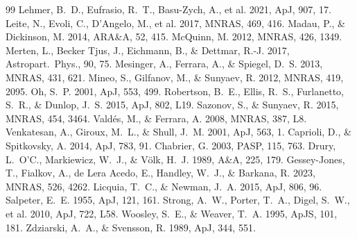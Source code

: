\documentclass[11pt,a4paper]{article}
\begin{document}
\begin{thebibliography}{99}
  Lehmer, B.~D., Eufrasio, R.~T., Basu-Zych, A., et al. 2021, ApJ, 907, 17.
  Leite, N., Evoli, C., D'Angelo, M., et al. 2017, MNRAS, 469, 416.
  Madau, P., \& Dickinson, M. 2014, ARA\&A, 52, 415.
  McQuinn, M. 2012, MNRAS, 426, 1349.
  Merten, L., Becker Tjus, J., Eichmann, B., \& Dettmar, R.-J. 2017,
  Astropart.\ Phys., 90, 75.
  Mesinger, A., Ferrara, A., \& Spiegel, D.~S. 2013, MNRAS, 431, 621.
  Mineo, S., Gilfanov, M., \& Sunyaev, R. 2012, MNRAS, 419, 2095.
  Oh, S.~P. 2001, ApJ, 553, 499.
  Robertson, B.~E., Ellis, R.~S., Furlanetto, S.~R., \& Dunlop, J.~S. 2015,
  ApJ, 802, L19.
  Sazonov, S., \& Sunyaev, R. 2015, MNRAS, 454, 3464.
  Vald\'es, M., \& Ferrara, A. 2008, MNRAS, 387, L8.
  Venkatesan, A., Giroux, M.~L., \& Shull, J.~M. 2001, ApJ, 563, 1.
  Caprioli, D., \& Spitkovsky, A. 2014, ApJ, 783, 91.
  Chabrier, G. 2003, PASP, 115, 763.
  Drury, L.~O'C., Markiewicz, W.~J., \& V\"olk, H.~J. 1989, A\&A, 225, 179.
  Gessey-Jones, T., Fialkov, A., de Lera Acedo, E., Handley, W.~J., \&
  Barkana, R. 2023, MNRAS, 526, 4262.
  Licquia, T.~C., \& Newman, J.~A. 2015, ApJ, 806, 96.
  Salpeter, E.~E. 1955, ApJ, 121, 161.
  Strong, A.~W., Porter, T.~A., Digel, S.~W., et al. 2010, ApJ, 722, L58.
  Woosley, S.~E., \& Weaver, T.~A. 1995, ApJS, 101, 181.
  Zdziarski, A.~A., \& Svensson, R. 1989, ApJ, 344, 551.
\end{thebibliography}
\end{document}
